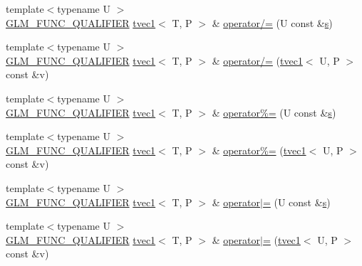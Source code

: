 \begin{DoxyCompactItemize}
\item 
{\footnotesize template$<$typename U $>$ }\\\hyperlink{setup_8hpp_a33fdea6f91c5f834105f7415e2a64407}{G\+L\+M\+\_\+\+F\+U\+N\+C\+\_\+\+Q\+U\+A\+L\+I\+F\+I\+ER} \hyperlink{structglm_1_1detail_1_1tvec1}{tvec1}$<$ T, P $>$ \& \hyperlink{structglm_1_1detail_1_1tvec1_ab1e87f461bbf279b20fc1e242b6e9f53}{operator/=} (U const \&\hyperlink{structglm_1_1detail_1_1tvec1_a1025b03a3e1f99c7a42518af40737d7b}{s})
\item 
{\footnotesize template$<$typename U $>$ }\\\hyperlink{setup_8hpp_a33fdea6f91c5f834105f7415e2a64407}{G\+L\+M\+\_\+\+F\+U\+N\+C\+\_\+\+Q\+U\+A\+L\+I\+F\+I\+ER} \hyperlink{structglm_1_1detail_1_1tvec1}{tvec1}$<$ T, P $>$ \& \hyperlink{structglm_1_1detail_1_1tvec1_a76603a1972a31cd51a5281e3794ae2e3}{operator/=} (\hyperlink{structglm_1_1detail_1_1tvec1}{tvec1}$<$ U, P $>$ const \&v)
\item 
{\footnotesize template$<$typename U $>$ }\\\hyperlink{setup_8hpp_a33fdea6f91c5f834105f7415e2a64407}{G\+L\+M\+\_\+\+F\+U\+N\+C\+\_\+\+Q\+U\+A\+L\+I\+F\+I\+ER} \hyperlink{structglm_1_1detail_1_1tvec1}{tvec1}$<$ T, P $>$ \& \hyperlink{structglm_1_1detail_1_1tvec1_a9a958fd9f0255f2d40924adcb2e9eb0c}{operator\%=} (U const \&\hyperlink{structglm_1_1detail_1_1tvec1_a1025b03a3e1f99c7a42518af40737d7b}{s})
\item 
{\footnotesize template$<$typename U $>$ }\\\hyperlink{setup_8hpp_a33fdea6f91c5f834105f7415e2a64407}{G\+L\+M\+\_\+\+F\+U\+N\+C\+\_\+\+Q\+U\+A\+L\+I\+F\+I\+ER} \hyperlink{structglm_1_1detail_1_1tvec1}{tvec1}$<$ T, P $>$ \& \hyperlink{structglm_1_1detail_1_1tvec1_a711db33765785eacc65e313535211c76}{operator\%=} (\hyperlink{structglm_1_1detail_1_1tvec1}{tvec1}$<$ U, P $>$ const \&v)
\item 
{\footnotesize template$<$typename U $>$ }\\\hyperlink{setup_8hpp_a33fdea6f91c5f834105f7415e2a64407}{G\+L\+M\+\_\+\+F\+U\+N\+C\+\_\+\+Q\+U\+A\+L\+I\+F\+I\+ER} \hyperlink{structglm_1_1detail_1_1tvec1}{tvec1}$<$ T, P $>$ \& \hyperlink{structglm_1_1detail_1_1tvec1_ad7e5c9133ebfccdebec443c62e91c61e}{operator$\vert$=} (U const \&\hyperlink{structglm_1_1detail_1_1tvec1_a1025b03a3e1f99c7a42518af40737d7b}{s})
\item 
{\footnotesize template$<$typename U $>$ }\\\hyperlink{setup_8hpp_a33fdea6f91c5f834105f7415e2a64407}{G\+L\+M\+\_\+\+F\+U\+N\+C\+\_\+\+Q\+U\+A\+L\+I\+F\+I\+ER} \hyperlink{structglm_1_1detail_1_1tvec1}{tvec1}$<$ T, P $>$ \& \hyperlink{structglm_1_1detail_1_1tvec1_ad91d6098835a4019b008360a48bde0ff}{operator$\vert$=} (\hyperlink{structglm_1_1detail_1_1tvec1}{tvec1}$<$ U, P $>$ const \&v)

\end{DoxyCompactItemize}
